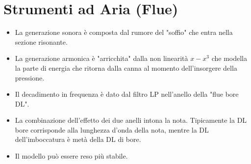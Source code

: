 \section{Strumenti ad Aria (Flue)}

\begin{itemize}
    \item La generazione sonora è composta dal rumore del "soffio" che entra nella sezione risonante.
    \item La generazione armonica è "arricchita" dalla non linearità \( x - x^3 \) che modella la parte di energia che ritorna dalla canna al momento dell’insorgere della pressione.
    \item Il decadimento in frequenza è dato dal filtro LP nell'anello della "flue bore DL".
    \item La combinazione dell'effetto dei due anelli intona la nota. Tipicamente la DL bore corrisponde alla lunghezza d'onda della nota, mentre la DL dell'imboccatura è metà della DL di bore.
    \item Il modello può essere reso più stabile.
\end{itemize}
